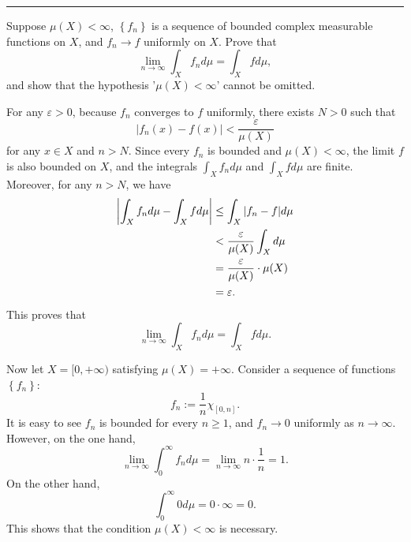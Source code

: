 \documentclass[letterpaper, 12pt]{article}
\begin{document}
\noindent\rule{7in}{2.8pt}
\begin{problem}{1.10}
Suppose \(\mu(X)<\infty\), \(\left\{ f_n \right\}\) is a sequence of bounded complex measurable functions on \(X\), and \(f_n\to f\) uniformly on \(X\). Prove that 
\[\lim_{n\to \infty}\int_X f_n d\mu=\int_X fd\mu,\]
and show that the hypothesis '\(\mu(X)<\infty\)' cannot be omitted.
\end{problem}
\begin{solution}
For any \(\varepsilon>0\), because \(f_n\) converges to \(f\) uniformly, there exists \(N>0\) such that 
\[|f_n(x)-f(x)|<\frac{\varepsilon}{\mu(X)}\]
for any \(x\in X\) and \(n>N\). Since every \(f_n\) is bounded and \(\mu(X)<\infty\), the limit \(f\) is also bounded on \(X\), and the integrals \(\int_X f_nd\mu\) and \(\int_X fd\mu\) are finite. Moreover, for any \(n>N\), we have 
\begin{align*}
     \left\lvert \int_X f_nd\mu-\int_X fd\mu\right\rvert&\leq \int_X|f_n-f|d\mu\\ 
                                  &<\frac{\varepsilon}{\mu(X)}\int_Xd\mu\\ 
                                  &=\frac{\varepsilon}{\mu(X)}\cdot \mu(X)\\
                                  &=\varepsilon.
\end{align*} 
This proves that 
\[\lim_{n\to \infty}\int_X f_nd\mu=\int_Xfd\mu.\]

Now let \(X=[0,+\infty)\) satisfying \(\mu(X)=+\infty\). Consider a sequence of functions \(\left\{ f_n \right\}\):
\[f_n:=\frac{1}{n}\chi_{[0,n]}.\]
It is easy to see \(f_n\) is bounded for every \(n\geq 1\), and \(f_n\to 0\) uniformly as \(n\to \infty\). However, on the one hand,
\[\lim_{n\to \infty}\int_0^\infty f_nd\mu=\lim_{n\to \infty}n\cdot \frac{1}{n}=1.\]
On the other hand, 
\[\int_0^\infty 0d\mu=0\cdot \infty=0.\]
This shows that the condition \(\mu(X)<\infty\) is necessary. 
\end{solution}
\end{document}
